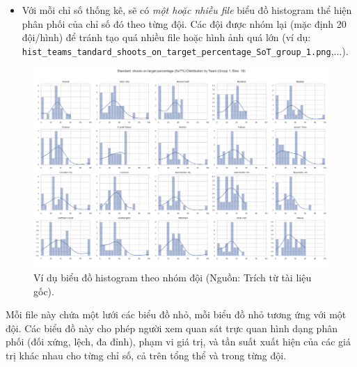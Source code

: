 \documentclass[12pt, a4paper]{report}
\begin{document}
\begin{itemize}
    \item Với mỗi chỉ số thống kê, sẽ có \textit{một hoặc nhiều file} biểu đồ histogram thể hiện phân phối của chỉ số đó theo từng đội. Các đội được nhóm lại (mặc định 20 đội/hình) để tránh tạo quá nhiều file hoặc hình ảnh quá lớn \sloppypar
    (ví dụ: \texttt{hist\_teams\_tandard\_shoots\_on\_target\_percentage\_SoT\_group\_1.png},...).
\end{itemize}

\begin{figure}[H]
    \centering
    \includegraphics[width=\textwidth]{by_team.png}
    \caption{Ví dụ biểu đồ histogram theo nhóm đội (Nguồn: Trích từ tài liệu gốc).}
    \label{fig:hist_teams_sot_group1}
\end{figure}

Mỗi file này chứa một lưới các biểu đồ nhỏ, mỗi biểu đồ nhỏ tương ứng với một đội.
Các biểu đồ này cho phép người xem quan sát trực quan hình dạng phân phối (đối xứng, lệch, đa đỉnh), phạm vi giá trị, và tần suất xuất hiện của các giá trị khác nhau cho từng chỉ số, cả trên tổng thể và trong từng đội.
\end{document}
